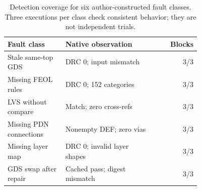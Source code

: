 \begin{table}[htbp]\centering\small\setlength{\tabcolsep}{4pt}
\caption{Detection coverage for six author-constructed fault classes. Three executions per class check consistent behavior; they are not independent trials.}\label{tab:faults}
\begin{tabular}{@{}p{0.30\linewidth}p{0.46\linewidth}r@{}}\toprule
Fault class & Native observation & Blocks \\
\midrule
Stale same-top GDS & DRC 0; input mismatch & 3/3 \\
Missing FEOL rules & DRC 0; 152 categories & 3/3 \\
LVS without compare & Match; zero cross-refs & 3/3 \\
Missing PDN connections & Nonempty DEF; zero vias & 3/3 \\
Missing layer map & DRC 0; invalid layer shapes & 3/3 \\
GDS swap after repair & Cached pass; digest mismatch & 3/3 \\
\bottomrule\end{tabular}\end{table}
